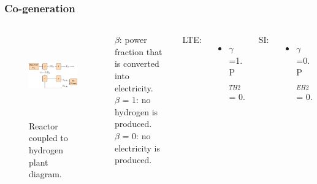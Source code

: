 \begin{frame}
\frametitle{Co-generation}
\begin{columns}
    \column[t]{6.5cm}
   	\begin{figure}[htbp!]
		\begin{center}
			\includegraphics[height=3.6cm]{images/hte-figure0.png}
		\end{center}
		\caption{Reactor coupled to hydrogen plant diagram.}
 	\end{figure}

 	\column[t]{3.5cm}
 	$\beta$: power fraction that is converted into electricity.
 	\\
    $\beta$ = 1: no hydrogen is produced.
    \\
 	$\beta$ = 0: no electricity is produced. \vspace{1cm}

 	LTE:
 	\begin{itemize}
 		\item $\gamma$=1. P$_{TH2}$ = 0.
 	\end{itemize}

    SI:
 	\begin{itemize}
 		\item $\gamma$=0. P$_{EH2}$ = 0.
 	\end{itemize}


\end{columns}
\end{frame}